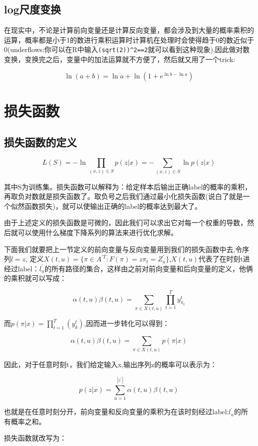 \documentclass[]{book}
\theoremstyle{definition}
\theoremstyle{definition}
\theoremstyle{definition}
\theoremstyle{remark}
\begin{document}
\section{log尺度变换}\label{log}

在现实中，不论是计算前向变量还是计算反向变量，都会涉及到大量的概率乘积的运算，概率都是小于1的数进行乘积运算时计算机在处理时会使得趋于0的数近似于0(underflows:你可以在R中输入\texttt{(sqrt(2))\^{}2==2}就可以看到这种现象),因此做对数变换，变换完之后，变量中的加法运算就不方便了，然后就又用了一个trick:

\[\ln(a+b)=\ln a+ \ln (1+e^{\ln b - \ln a})\]

\chapter{损失函数}

\section{损失函数的定义}

\[L(S) = -\ln\prod_{(x,z)\in S} p(z|x) = -\sum_{(x,z)\in S} \ln p(z|x)\]

其中S为训练集。损失函数可以解释为：给定样本后输出正确label的概率的乘积，再取负对数就是损失函数了。取负号之后我们通过最小化损失函数(说白了就是一个似然函数损失)，就可以使输出正确的label的概率达到最大了。

由于上述定义的损失函数是可微的，因此我们可以求出它对每一个权重的导数，然后就可以使用什么梯度下降系列的算法来进行优化求解。

下面我们就要把上一节定义的前向变量与反向变量用到我们的损失函数中去,令序列\(l=z\),
定义\(X(t,u)=\{\pi \in A^{'T}: F(\pi)=z\pi_t=Z_u^{'}\}\),\(X(t,u)\)代表了在时刻t进经过label：\(l_u^{'}\)的所有路径的集合，这样由之前对前向变量和后向变量的定义，他俩的乘积就可以写成：

\[\alpha(t,u)\beta(t,u) = \sum_{\pi \in X(t,u)} \prod_{t=1}^Ty_{\pi_t}^t\]

而\(p(\pi|x)=\prod_{t=1}^T(y_k^t)\),因而进一步转化可以得到：

\[\alpha(t,u)\beta(t,u) = \sum_{\pi \in X(t,u)}p(\pi|x)\]

因此，对于任意时刻t，我们给定输入x,输出序列z的概率可以表示为：

\[p(z|x)=\sum_{u=1}^{|z^{'}|}\alpha(t,u)\beta(t,u)\]

也就是在任意时刻分开，前向变量和反向变量的乘积为在该时刻经过label:\(l_u^{'}\)的所有概率之和。

损失函数就改写为：
\end{document}
